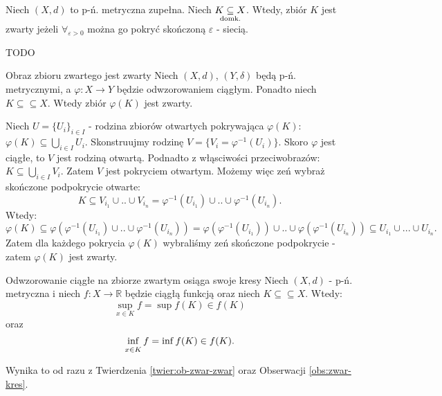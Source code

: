 \documentclass{article}
\numberwithin{defi}{section}
\numberwithin{defi}{section}
\newcommand{\R}{\mathbb{R}}
\newcommand{\subdomk}{\underset{\clap{\scriptsize domk.}}{\subseteq}}
\newcommand{\se}{\subseteq}
\renewcommand{\inf}{\mathop{\mathrm{inf}\vphantom{\mathrm{sup}}}}
\providecommand{\eps}{\varepsilon}
\begin{document}
    \begin{twier}{}
        Niech $(X, d)$ to p-ń. metryczna zupełna. Niech $K \subdomk X$. Wtedy, zbiór $K$ jest zwarty jeżeli $\forall_{\eps >0}$ można go pokryć skończoną $\eps$ - siecią.
    \end{twier}
    \begin{dow}
        TODO
    \end{dow}


\begin{twier}[label=twier:ob-zwar-zwar]{Obraz zbioru zwartego jest zwarty}
    Niech $(X, d)$, $(Y, \delta)$ będą p-ń. metrycznymi, a $\varphi: X \to Y$ będzie odwzorowaniem ciągłym. Ponadto niech $K \subseteq \subseteq X$. Wtedy zbiór $\varphi(K)$ jest zwarty.
\end{twier}


\begin{dow}
    Niech $U = \{ U_i \}_{i \in I}$ - rodzina zbiorów otwartych pokrywająca $\varphi(K)$: $\varphi(K) \se \bigcup_{i \in I} U_i $. Skonstruujmy rodzinę $V = \{ V_i = \varphi^{-1}(U_i) \}$. Skoro $\varphi$ jest ciągłe, to $V$ jest rodziną otwartą. Podnadto z włąsciwości przeciwobrazów: $K \se \bigcup_{i \in I}V_i$. Zatem $V$ jest pokryciem otwartym. Możemy więc zeń wybraż skończone podpokrycie otwarte: \begin{equation*}
        K \se V_{i_1} \cup .. \cup V_{i_n} = \varphi^{-1}(U_{i_1}) \cup .. \cup \varphi^{-1}(U_{i_n}).
    \end{equation*} Wtedy: \begin{equation*}
        \varphi(K) \se \varphi(\varphi^{-1}(U_{i_1}) \cup .. \cup \varphi^{-1}(U_{i_n})) = \varphi(\varphi^{-1}(U_{i_1})) \cup .. \cup \varphi(\varphi^{-1}(U_{i_n})) \se U_{i_1} \cup ... \cup U_{i_n}.
    \end{equation*} Zatem dla każdego pokrycia $\varphi(K)$ wybraliśmy zeń skończone podpokrycie - zatem $\varphi(K)$ jest zwarty.
\end{dow}

\begin{obs}{Odwzorowanie ciągłe na zbiorze zwartym osiąga swoje kresy}
    Niech $(X, d)$ - p-ń. metryczna i niech $f: X \to \R$ będzie ciągłą funkcją oraz niech $K \se \se X$. Wtedy: \begin{equation}
        \sup_{x \in K} f = \sup f(K) \in f(K) 
    \end{equation} oraz\begin{equation}
        \inf_{x \in K} f = \inf f(K) \in f(K).
    \end{equation}
\end{obs}
    Wynika to od razu z Twierdzenia \ref{twier:ob-zwar-zwar} oraz Obserwacji \ref{obs:zwar-kres}.
    
\end{document}
